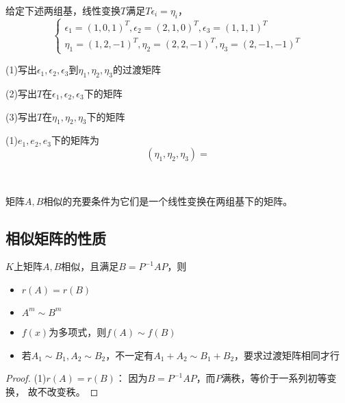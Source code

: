 \begin{exercise}[线性变换在不同基下的矩阵]
  给定下述两组基，线性变换$T$满足$T\epsilon_i = \eta_i$，
  \begin{equation*}
    \begin{cases}
      \epsilon_1 = (1,0,1)^T, \epsilon_2 = (2,1,0)^T, \epsilon_3 = (1,1,1)^T\\
      \eta_1 = (1,2,-1)^T, \eta_2 = (2,2,-1)^T, \eta_3 = (2,-1,-1)^T
    \end{cases}
  \end{equation*}

  (1)写出$\epsilon_1,\epsilon_2,\epsilon_3$到$\eta_1,\eta_2,\eta_3$的过渡矩阵

  (2)写出$T$在$\epsilon_1,\epsilon_2,\epsilon_3$下的矩阵

  (3)写出$T$在$\eta_1,\eta_2,\eta_3$下的矩阵
\end{exercise}

\begin{solution}
  (1)$e_1,e_2,e_3$下的矩阵为
  \begin{equation*}
    (\eta_1,\eta_2,\eta_3) = 
  \end{equation*}
\end{solution}

~

\begin{theorem}[线性变换构造的等价类]
  矩阵$A,B$相似的充要条件为它们是一个线性变换在两组基下的矩阵。
\end{theorem}

\subsection{相似矩阵的性质}

\begin{theorem}[相似矩阵的基本性质]
  $K$上矩阵$A,B$相似，且满足$B = P^{-1}AP$，则
  \begin{itemize}
  \item $r(A) = r(B)$
  \item $A^m \sim B^m$
  \item $f(x)$为多项式，则$f(A) \sim f(B)$
  \item 若$A_1 \sim B_1, A_2 \sim B_2$，不一定有$A_1 + A_2 \sim B_1 + B_2$，要求过渡矩阵相同才行
  \end{itemize}
\end{theorem}

\begin{proof}
  (1)$r(A) = r(B)$：
  因为$B = P^{-1}AP$，而$P$满秩，等价于一系列初等变换，
  故不改变秩。
\end{proof}

